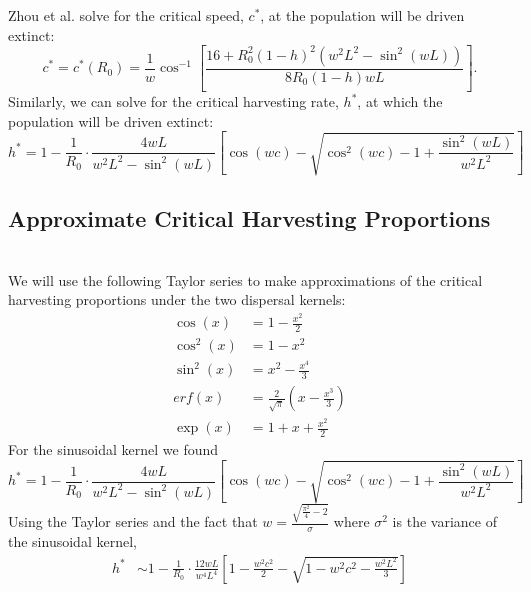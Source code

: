 \documentclass[12pt,english]{article}
\begin{document}
\begin{spacing}{1.9}
\begin{flushleft}
Zhou et al. \citep{ZhouKot2011} solve for the critical speed, $c^*$, at the population will be driven extinct:
$$c^*=c^*(R_0)=\frac{1}{w}\cos^{-1}\left[\frac{16+R_0^2(1-h)^2(w^2L^2-\sin^2(wL))}{8R_0(1-h)wL}\right].$$
Similarly, we can solve for the critical harvesting rate, $h^*$, at which the population will be driven extinct:
$$
h^*=1-\frac{1}{R_0}\cdot\frac{4wL}{w^2L^2-\sin^2(wL)}\left[\cos(wc)-\sqrt{\cos^2(wc)-1+\frac{\sin^2(wL)}{w^2L^2}}\right] 
$$

\subsection{Approximate Critical Harvesting Proportions}
~\\We will use the following Taylor series to make approximations of the critical harvesting proportions under the two dispersal kernels:
\begin{align*}
\cos(x)&=1-\frac{x^2}{2}
\\ \cos^2(x)&=1-x^2
\\ \sin^2(x)&=x^2-\frac{x^4}{3}
\\ erf(x)&=\frac{2}{\sqrt{\pi}}(x-\frac{x^3}{3})
\\ \exp(x)&=1+x+\frac{x^2}{2}
\end{align*}
For the sinusoidal kernel we found 
\begin{equation}
h^*=1-\frac{1}{R_0}\cdot\frac{4wL}{w^2L^2-\sin^2(wL)}\left[\cos(wc)-\sqrt{\cos^2(wc)-1+\frac{\sin^2(wL)}{w^2L^2}}\right] 
\end{equation} 
Using the Taylor series and the fact that $w=\frac{\sqrt{\frac{\pi^2}{4}-2}}{\sigma}$ where $\sigma^2$ is the variance of the sinusoidal kernel,
\begin{align*}
h^*&\sim 1-\frac{1}{R_0}\cdot\frac{12wL}{w^4L^4}\left[1-\frac{w^2c^2}{2}-\sqrt{1-w^2c^2-\frac{w^2L^2}{3}}\right]

\end{align*}
\end{flushleft}
\end{spacing}
\end{document}
